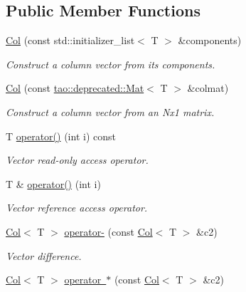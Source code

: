 \subsection*{Public Member Functions}
\begin{DoxyCompactItemize}
\item 
\mbox{\hyperlink{classtao_1_1deprecated_1_1_col_a71db20226883e22a687cebe7d590cf6d}{Col}} (const std\+::initializer\+\_\+list$<$ T $>$ \&components)
\begin{DoxyCompactList}\small\item\em Construct a column vector from its components. \end{DoxyCompactList}\item 
\mbox{\label{classtao_1_1deprecated_1_1_col_a458d95eede68b43105a240064cf47c23}} 
\mbox{\hyperlink{classtao_1_1deprecated_1_1_col_a458d95eede68b43105a240064cf47c23}{Col}} (const \mbox{\hyperlink{classtao_1_1deprecated_1_1_mat}{tao\+::deprecated\+::\+Mat}}$<$ T $>$ \&colmat)
\begin{DoxyCompactList}\small\item\em Construct a column vector from an Nx1 matrix. \end{DoxyCompactList}\item 
T \mbox{\hyperlink{classtao_1_1deprecated_1_1_col_a91cd4f8b512f2b982183ffca98b09a4e}{operator()}} (int i) const
\begin{DoxyCompactList}\small\item\em Vector read-\/only access operator. \end{DoxyCompactList}\item 
T \& \mbox{\hyperlink{classtao_1_1deprecated_1_1_col_a5095560139f140b6ebac8e1eb33442f2}{operator()}} (int i)
\begin{DoxyCompactList}\small\item\em Vector reference access operator. \end{DoxyCompactList}\item 
\mbox{\hyperlink{classtao_1_1deprecated_1_1_col}{Col}}$<$ T $>$ \mbox{\hyperlink{classtao_1_1deprecated_1_1_col_a8123b7620282f28f271b7e723738a1dd}{operator-\/}} (const \mbox{\hyperlink{classtao_1_1deprecated_1_1_col}{Col}}$<$ T $>$ \&c2)
\begin{DoxyCompactList}\small\item\em Vector difference. \end{DoxyCompactList}\item 
\mbox{\hyperlink{classtao_1_1deprecated_1_1_col}{Col}}$<$ T $>$ \mbox{\hyperlink{classtao_1_1deprecated_1_1_col_ac84032af63de62d7a14fe6c1e85c8251}{operator $\ast$}} (const \mbox{\hyperlink{classtao_1_1deprecated_1_1_col}{Col}}$<$ T $>$ \&c2)

\end{DoxyCompactItemize}

